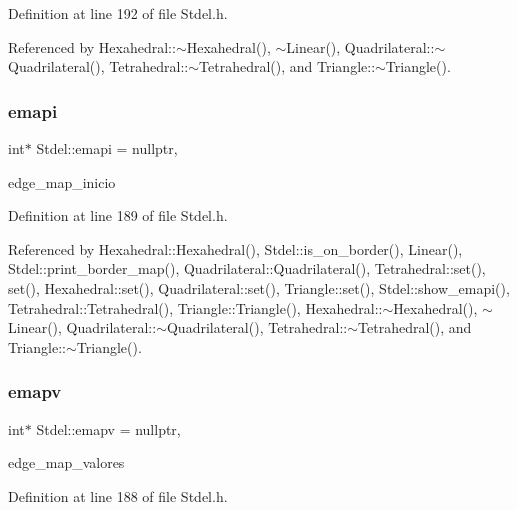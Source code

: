 Definition at line 192 of file Stdel.\+h.



Referenced by Hexahedral\+::$\sim$\+Hexahedral(), $\sim$\+Linear(), Quadrilateral\+::$\sim$\+Quadrilateral(), Tetrahedral\+::$\sim$\+Tetrahedral(), and Triangle\+::$\sim$\+Triangle().

\mbox{\label{classStdel_a9ba8eb743aeb36984b7c4ececa837e16}} 
\subsubsection{\texorpdfstring{emapi}{emapi}}
{\footnotesize\ttfamily int$\ast$ Stdel\+::emapi = nullptr\hspace{0.3cm}{\ttfamily [protected]}, {\ttfamily [inherited]}}



edge\+\_\+map\+\_\+inicio 



Definition at line 189 of file Stdel.\+h.



Referenced by Hexahedral\+::\+Hexahedral(), Stdel\+::is\+\_\+on\+\_\+border(), Linear(), Stdel\+::print\+\_\+border\+\_\+map(), Quadrilateral\+::\+Quadrilateral(), Tetrahedral\+::set(), set(), Hexahedral\+::set(), Quadrilateral\+::set(), Triangle\+::set(), Stdel\+::show\+\_\+emapi(), Tetrahedral\+::\+Tetrahedral(), Triangle\+::\+Triangle(), Hexahedral\+::$\sim$\+Hexahedral(), $\sim$\+Linear(), Quadrilateral\+::$\sim$\+Quadrilateral(), Tetrahedral\+::$\sim$\+Tetrahedral(), and Triangle\+::$\sim$\+Triangle().

\mbox{\label{classStdel_a39326d0ef108403223402c79b424a41b}} 
\subsubsection{\texorpdfstring{emapv}{emapv}}
{\footnotesize\ttfamily int$\ast$ Stdel\+::emapv = nullptr\hspace{0.3cm}{\ttfamily [protected]}, {\ttfamily [inherited]}}



edge\+\_\+map\+\_\+valores 



Definition at line 188 of file Stdel.\+h.



